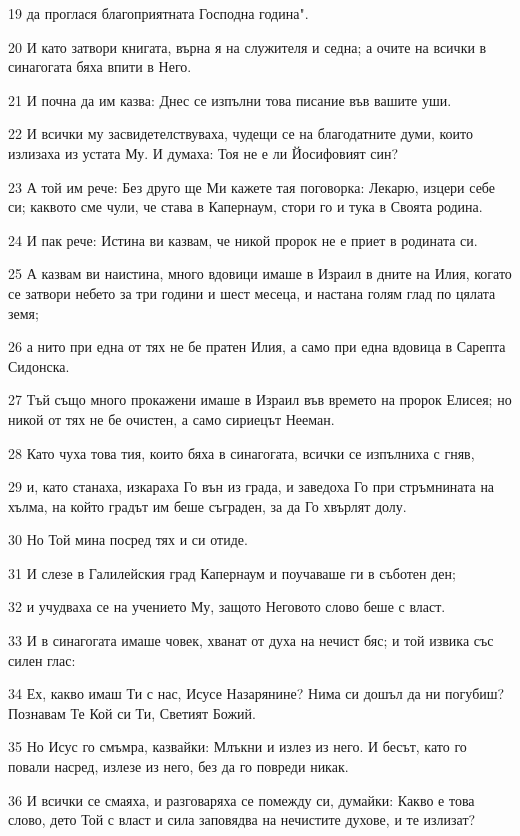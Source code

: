 \par 19 да проглася благоприятната Господна година".
\par 20 И като затвори книгата, върна я на служителя и седна; а очите на всички в синагогата бяха впити в Него.
\par 21 И почна да им казва: Днес се изпълни това писание във вашите уши.
\par 22 И всички му засвидетелствуваха, чудещи се на благодатните думи, които излизаха из устата Му. И думаха: Тоя не е ли Йосифовият син?
\par 23 А той им рече: Без друго ще Ми кажете тая поговорка: Лекарю, изцери себе си; каквото сме чули, че става в Капернаум, стори го и тука в Своята родина.
\par 24 И пак рече: Истина ви казвам, че никой пророк не е приет в родината си.
\par 25 А казвам ви наистина, много вдовици имаше в Израил в дните на Илия, когато се затвори небето за три години и шест месеца, и настана голям глад по цялата земя;
\par 26 а нито при една от тях не бе пратен Илия, а само при една вдовица в Сарепта Сидонска.
\par 27 Тъй също много прокажени имаше в Израил във времето на пророк Елисея; но никой от тях не бе очистен, а само сириецът Нееман.
\par 28 Като чуха това тия, които бяха в синагогата, всички се изпълниха с гняв,
\par 29 и, като станаха, изкараха Го вън из града, и заведоха Го при стръмнината на хълма, на който градът им беше съграден, за да Го хвърлят долу.
\par 30 Но Той мина посред тях и си отиде.
\par 31 И слезе в Галилейския град Капернаум и поучаваше ги в съботен ден;
\par 32 и учудваха се на учението Му, защото Неговото слово беше с власт.
\par 33 И в синагогата имаше човек, хванат от духа на нечист бяс; и той извика със силен глас:
\par 34 Ех, какво имаш Ти с нас, Исусе Назарянине? Нима си дошъл да ни погубиш? Познавам Те Кой си Ти, Светият Божий.
\par 35 Но Исус го смъмра, казвайки: Млъкни и излез из него. И бесът, като го повали насред, излезе из него, без да го повреди никак.
\par 36 И всички се смаяха, и разговаряха се помежду си, думайки: Какво е това слово, дето Той с власт и сила заповядва на нечистите духове, и те излизат?
